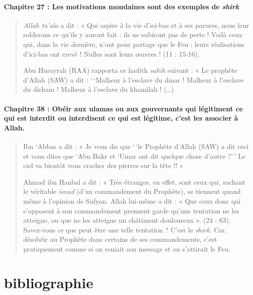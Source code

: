 \paragraph{{Chapitre 27} : Les motivations mondaines sont des
exemples de \emph{shirk}}
\begin{quote}
\emph{Allah ta'ala} a dit : « Qui aspire à la vie d'ici-bas et à ses
parures, nous leur solderons ce qu'ils y auront fait : ils ne subiront
pas de perte ! Voilà ceux qui, dans la vie dernière, n'ont pour partage
que le Feu : leurs réalisations d'ici-bas ont crevé ! Nulles sont leurs
œuvres ! (11 : 15-16).

Abu Hurayrah (RAA) rapporta ce hadith \emph{sahih} suivant : « Le
prophète d'Allah (SAW) a dit : `\,`Malheur à l'esclave du dinar !
Malheur à l'esclave du dirham ! Malheur à l'esclave du khamilah !
(\ldots)
\end{quote}
\paragraph{{Chapitre 38} : Obéir aux ulamas ou aux gouvernants
qui légitiment ce qui est interdit ou interdisent ce qui est légitime,
c'est les associer à Allah.}
\begin{quote}
Ibn `Abbas a dit : « Je vous dis que `\,`le Prophète d'Allah (SAW) a dit
ceci et vous dites que `Abu Bakr et `Umar ont dit quelque chose d'autre
?'\,' Le ciel va bientôt vous cracher des pierres sur la tête !! »

Ahmad ibn Hanbal a dit : « Très étranges, en effet, sont ceux qui,
sachant le véritable \emph{isnad} (d'un commandement du Prophète), se
tiennent quand même à l'opinion de Sufyan. Allah lui-même a dit : « Que
ceux donc qui s'opposent à son commandement prennent garde qu'une
tentation ne les atteigne, ou que ne les atteigne un châtiment
douloureux ». (24 : 63). Savez-vous ce que peut être une telle tentation
? C'est le \emph{shirk}. Car, désobéir au Prophète dans certains de ses
commandements, c'est pratiquement comme si on reniait son message et on
s'attirait le Feu.

\end{quote}


\section{bibliographie}

 

